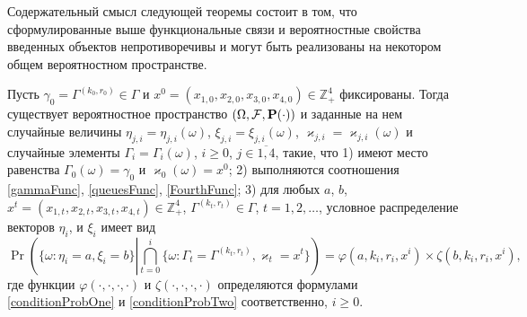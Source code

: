 \documentclass[a4paper,12pt,russian]{extarticle}
\begin{document}
Содержательный смысл следующей теоремы состоит в том, что сформулированные выше функциональные связи и вероятностные свойства введенных объектов непротиворечивы и могут быть реализованы на некотором общем вероятностном пространстве.
\begin{theorem}
Пусть $\gamma_0=\Gamma^{(k_0,r_0)}\in \Gamma$ и $x^0=(x_{1,0},x_{2,0}, x_{3,0},x_{4,0})\in \mathbb{Z}_+^4$ фиксированы.
Тогда существует вероятностное пространство $(\Omega, {\cal F}, \Pr(\cdot))$ и заданные на нем случайные величины $\eta_{j,i}=\eta_{j,i}(\omega)$, $\xi_{j,i}=\xi_{j,i}(\omega)$, 	 $\varkappa_{j,i}=\varkappa_{j,i}(\omega)$ и случайные элементы $\Gamma_i=\Gamma_i(\omega)$, $i\geqslant 0$, $j\in \overline{1,4}$, такие, что 1) имеют место равенства $\Gamma_0(\omega) = \gamma_0$ и $\varkappa_0(\omega)=x^0$; 2) выполняются соотношения \eqref{gammaFunc}, \eqref{queuesFunc}, \eqref{FourthFunc}; 3) для любых  $a$, $b$, $x^t=(x_{1,t},x_{2,t},x_{3,t},x_{4,t}) \in \mathbb{Z}_+^4$, $\Gamma^{(k_t,r_t)} \in \Gamma$, $t = 1, 2, \ldots$, условное распределение векторов $\eta_i$, и $\xi_i$ имеет вид
\begin{equation}
\Pr \left(\{ \omega \colon \eta_i = a, \xi_i=b\} \left|\bigcap_{t=0}^{i}\{\omega\colon \Gamma_t=\Gamma^{(k_t,r_t)}, \varkappa_t=x^t\}\right.\right)=
\varphi(a,k_i,r_i,x^i)\times \zeta(b,k_i,r_i,x^i),
\label{ProbablititiesToProve}
\end{equation}
где функции $\varphi(\cdot, \cdot, \cdot, \cdot)$ и $\zeta(\cdot, \cdot, \cdot, \cdot)$ определяются формулами \eqref{conditionProbOne} и \eqref{conditionProbTwo} соответственно, $i \geqslant 0$.

\label{myTheorem}
\end{theorem}
\end{document}
